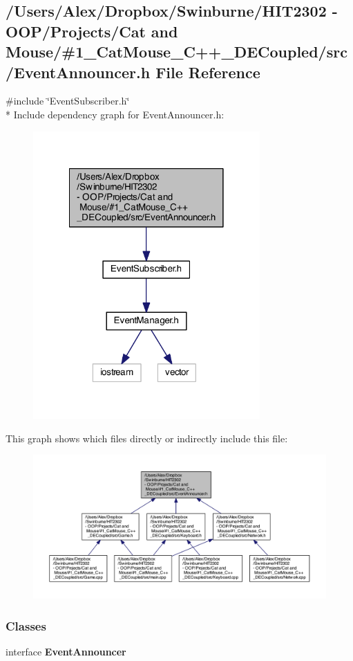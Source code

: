 \subsection{/\-Users/\-Alex/\-Dropbox/\-Swinburne/\-H\-I\-T2302 -\/ O\-O\-P/\-Projects/\-Cat and Mouse/\#1\-\_\-\-Cat\-Mouse\-\_\-\-C++\-\_\-\-D\-E\-Coupled/src/\-Event\-Announcer.h File Reference}
\label{_event_announcer_8h}
{\ttfamily \#include \char`\"{}Event\-Subscriber.\-h\char`\"{}}\\*
Include dependency graph for Event\-Announcer.\-h\-:
\nopagebreak
\begin{figure}[H]
\begin{center}
\leavevmode
\includegraphics[width=246pt]{_event_announcer_8h__incl}
\end{center}
\end{figure}
This graph shows which files directly or indirectly include this file\-:
\nopagebreak
\begin{figure}[H]
\begin{center}
\leavevmode
\includegraphics[width=350pt]{_event_announcer_8h__dep__incl}
\end{center}
\end{figure}
\subsubsection*{Classes}
\begin{DoxyCompactItemize}
\item 
interface {\bf Event\-Announcer}
\end{DoxyCompactItemize}
